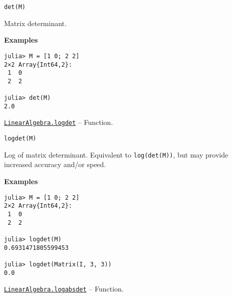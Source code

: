 \begin{adjustwidth}{2em}{0pt}


\begin{verbatim}
det(M)
\end{verbatim}

Matrix determinant.

\textbf{Examples}


\begin{verbatim}
julia> M = [1 0; 2 2]
2×2 Array{Int64,2}:
 1  0
 2  2

julia> det(M)
2.0
\end{verbatim}



\end{adjustwidth}
\hypertarget{12765142073947245963}{} 
\hyperlink{12765142073947245963}{\texttt{LinearAlgebra.logdet}}  -- {Function.}

\begin{adjustwidth}{2em}{0pt}


\begin{verbatim}
logdet(M)
\end{verbatim}

Log of matrix determinant. Equivalent to \texttt{log(det(M))}, but may provide increased accuracy and/or speed.

\textbf{Examples}


\begin{verbatim}
julia> M = [1 0; 2 2]
2×2 Array{Int64,2}:
 1  0
 2  2

julia> logdet(M)
0.6931471805599453

julia> logdet(Matrix(I, 3, 3))
0.0
\end{verbatim}



\end{adjustwidth}
\hypertarget{11067048979448481853}{} 
\hyperlink{11067048979448481853}{\texttt{LinearAlgebra.logabsdet}}  -- {Function.}

